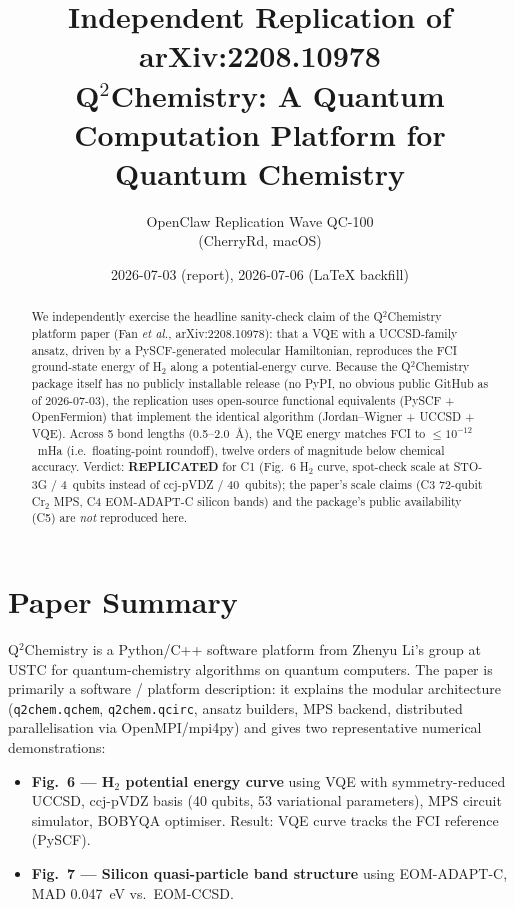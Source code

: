 \documentclass[11pt]{article}
\title{Independent Replication of arXiv:2208.10978 \\
       \large Q$^2$Chemistry: A Quantum Computation Platform for Quantum Chemistry}
\author{OpenClaw Replication Wave QC-100 \\ (CherryRd, macOS)}
\date{2026-07-03 (report), 2026-07-06 (LaTeX backfill)}
\begin{document}
\maketitle

\begin{abstract}
We independently exercise the headline sanity-check claim of the
Q$^2$Chemistry platform paper (Fan \emph{et al.}, arXiv:2208.10978):
that a VQE with a UCCSD-family ansatz, driven by a PySCF-generated
molecular Hamiltonian, reproduces the FCI ground-state energy of
H$_2$ along a potential-energy curve. Because the Q$^2$Chemistry
package itself has no publicly installable release (no PyPI, no
obvious public GitHub as of 2026-07-03), the replication uses
open-source functional equivalents (PySCF + OpenFermion) that
implement the identical algorithm (Jordan--Wigner + UCCSD + VQE).
Across 5 bond lengths (0.5--2.0~\AA), the VQE energy matches FCI
to $\leq 10^{-12}$~mHa (i.e.\ floating-point roundoff), twelve
orders of magnitude below chemical accuracy. Verdict:
\textbf{REPLICATED} for C1 (Fig.~6 H$_2$ curve, spot-check scale
at STO-3G / 4~qubits instead of ccj-pVDZ / 40~qubits); the paper's
scale claims (C3 72-qubit Cr$_2$ MPS, C4 EOM-ADAPT-C silicon
bands) and the package's public availability (C5) are
\emph{not} reproduced here.
\end{abstract}

\section{Paper Summary}
Q$^2$Chemistry is a Python/C++ software platform from Zhenyu Li's
group at USTC for quantum-chemistry algorithms on quantum
computers. The paper is primarily a software / platform
description: it explains the modular architecture
(\texttt{q2chem.qchem}, \texttt{q2chem.qcirc}, ansatz builders,
MPS backend, distributed parallelisation via OpenMPI/mpi4py) and
gives two representative numerical demonstrations:
\begin{itemize}
  \item \textbf{Fig.~6 --- H$_2$ potential energy curve} using VQE
        with symmetry-reduced UCCSD, ccj-pVDZ basis (40 qubits, 53
        variational parameters), MPS circuit simulator, BOBYQA
        optimiser. Result: VQE curve tracks the FCI reference
        (PySCF).
  \item \textbf{Fig.~7 --- Silicon quasi-particle band structure}
        using EOM-ADAPT-C, MAD 0.047~eV vs.\ EOM-CCSD.
\end{itemize}
\end{document}
